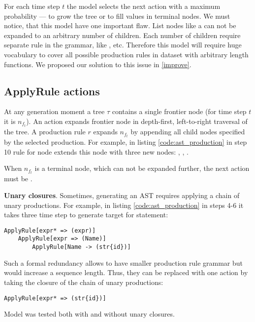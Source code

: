 For each time step $t$ the model selects the next action with a maximum probability ---  to grow the tree or  to fill values in terminal nodes. We must notice, that this model have one important flaw. List nodes like a  can not be expanded to an arbitrary number of children. Each number of children require separate rule in the grammar, like ,  etc. Therefore this model will require huge vocabulary to cover all possible production rules in dataset with arbitrary length functions. We proposed our solution to this issue in \cref{improve}.

\subsection{ApplyRule actions}
At any generation moment a tree $\tau$ contains a single frontier node (for time step $t$ it is $n_{f_t}$). An action  expands frontier node in depth-first, left-to-right traversal of the tree. A production rule $r$ expands $n_{f_t}$ by appending all child nodes specified by the selected production. For example, in listing \ref{code:ast_production} in step 10 rule for node  extends this node with three new nodes: , , . 

When $n_{f_t}$ is a terminal node, which can not be expanded further, the next action must be .

\textbf{Unary closures}. Sometimes, generating an AST requires applying a chain of unary productions. For example, in listing \ref{code:ast_production} in steps 4-6 it takes three time step to generate target for  statement:

\begin{verbatim}
ApplyRule[expr* => (expr)]
    ApplyRule[expr => (Name)]
        ApplyRule[Name -> (str{id})]
\end{verbatim}

Such a formal redundancy allows to have smaller production rule grammar but would increase a sequence length. Thus, they can be replaced with one action by taking the closure of the chain of unary productions:

\begin{verbatim}
ApplyRule[expr* => (str{id})]
\end{verbatim}

Model was tested both with and without unary closures.

